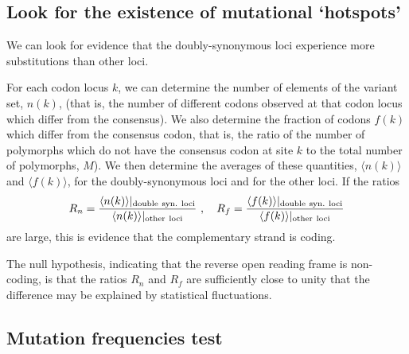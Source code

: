 \documentclass[unnumsec,webpdf,contemporary,large]{oup-authoring-template}%
\theoremstyle{thmstyleone}%
\theoremstyle{thmstyletwo}%
\theoremstyle{thmstylethree}%
\begin{document}
\subsection{{\bf Look for the existence of mutational \lq hotspots'}}
\label{sec: 4.1}

We can look for evidence that the doubly-synonymous loci experience more substitutions than other loci.

For each codon locus $k$, we can determine the number of elements of the variant set, $n(k)$,
(that is, the number of different codons observed at that codon locus which differ from the consensus).
We also determine the fraction of codons $f(k)$ which differ from the consensus codon, that is, the ratio
of the number of polymorphs which do not have the consensus codon at site $k$ to the total
number of polymorphs, $M$).
We then determine the averages of these quantities, $\langle n(k)\rangle$ and $\langle f(k)\rangle$,
for the doubly-synonymous loci and for the other loci. If the ratios
%
\begin{equation}
\label{eq: 4.1}
R_n=\frac{\langle n(k)\rangle\vert_{\rm double\ syn.\ loci}}{\langle n(k)\rangle\vert_{\rm other\ loci}}
\ ,\ \ \
R_f=\frac{\langle f(k)\rangle\vert_{\rm double\ syn.\ loci}}{\langle f(k)\rangle\vert_{\rm other\ loci}}
\end{equation}
%
are large, this is evidence that the complementary strand is coding.

The null hypothesis, indicating that the reverse open reading frame is
non-coding, is that the ratios $R_n$ and $R_f$ are sufficiently close to
unity that the difference may be explained by statistical fluctuations.

\subsection{{\bf Mutation frequencies test}}
\label{sec: 4.2}
\end{document}
